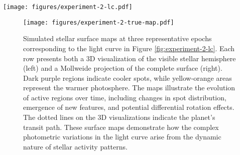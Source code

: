 \documentclass[twocolumn]{aastex631}
\begin{document}
%
\begin{figure*}[hbt!]
    \begin{centering}
        \texttt{[image: figures/experiment-2-lc.pdf]}
        \caption{
            Simulated light curve from our evolving stellar surface model spanning approximately 150 days. The black line represents 
            the true underlying flux variations, while the blue points with error bars show binned simulated observations. 
            The complex pattern of photometric variability, with amplitude variations between approximately 0.87 and 1.12 in 
            relative flux, reflects the combined effects of stellar rotation and evolving surface features. Note the non-periodic 
            nature of the variations and changing amplitude over time, indicative of multiple active regions evolving at different 
            rates and locations on the stellar surface.}
        \label{fig:experiment-2-lc}
    \end{centering}
\end{figure*}
%
%
\begin{figure}[hbt!]
    \begin{centering}
        \texttt{[image: figures/experiment-2-true-map.pdf]}
        \caption{Simulated stellar surface maps at three representative epochs corresponding to the light curve in 
        Figure \ref{fig:experiment-2-lc}. Each row presents both a 3D visualization of the visible stellar hemisphere 
        (left) and a Mollweide projection of the complete surface (right). Dark purple regions indicate cooler spots, while 
        yellow-orange areas represent the warmer photosphere. The maps illustrate the evolution of active regions over time, 
        including changes in spot distribution, emergence of new features, and potential differential rotation effects. 
        The dotted lines on the 3D visualizations indicate the planet's transit path. These surface maps demonstrate how the 
        complex photometric variations in the light curve arise from the dynamic nature of stellar activity patterns.}
        \label{fig:experiment-2-true-maps}
    \end{centering}
\end{figure}
%
\end{document}
